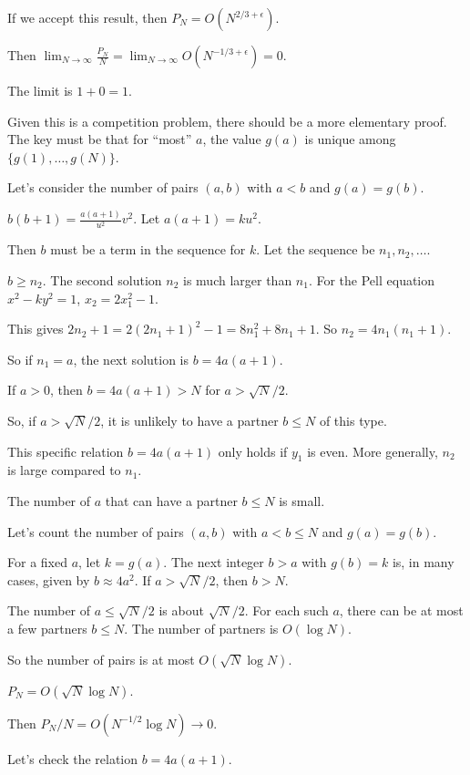 \documentclass[12pt,a4paper]{article}
\theoremstyle{definition}
\begin{document}
    If we accept this result, then $P_N = O(N^{2/3+\epsilon})$.

    Then $\lim_{N\to\infty} \frac{P_N}{N} = \lim_{N\to\infty} O(N^{-1/3+\epsilon}) = 0$.

    The limit is $1+0=1$.

    Given this is a competition problem, there should be a more elementary proof. The key must be that for ``most'' $a$, the value $g(a)$ is unique among $\{g(1), \dots, g(N)\}$.

    Let's consider the number of pairs $(a,b)$ with $a<b$ and $g(a)=g(b)$.

    $b(b+1) = \frac{a(a+1)}{u^2}v^2$. Let $a(a+1)=k u^2$.

    Then $b$ must be a term in the sequence for $k$. Let the sequence be $n_1, n_2, \dots$.

    $b \geq n_2$. The second solution $n_2$ is much larger than $n_1$. For the Pell equation $x^2-ky^2=1$, $x_2 = 2x_1^2-1$.

    This gives $2n_2+1 = 2(2n_1+1)^2-1 = 8n_1^2+8n_1+1$. So $n_2 = 4n_1(n_1+1)$.

    So if $n_1=a$, the next solution is $b=4a(a+1)$.

    If $a>0$, then $b=4a(a+1)>N$ for $a > \sqrt{N}/2$.

    So, if $a > \sqrt{N}/2$, it is unlikely to have a partner $b \leq N$ of this type.

    This specific relation $b=4a(a+1)$ only holds if $y_1$ is even. More generally, $n_2$ is large compared to $n_1$.

    The number of $a$ that can have a partner $b \leq N$ is small.

    Let's count the number of pairs $(a,b)$ with $a<b \leq N$ and $g(a)=g(b)$.

    For a fixed $a$, let $k=g(a)$. The next integer $b>a$ with $g(b)=k$ is, in many cases, given by $b \approx 4a^2$. If $a > \sqrt{N}/2$, then $b>N$.

    The number of $a \leq \sqrt{N}/2$ is about $\sqrt{N}/2$. For each such $a$, there can be at most a few partners $b \leq N$. The number of partners is $O(\log N)$.

    So the number of pairs is at most $O(\sqrt{N}\log N)$.

    $P_N = O(\sqrt{N}\log N)$.

    Then $P_N/N = O(N^{-1/2}\log N) \to 0$.

    Let's check the relation $b=4a(a+1)$.
\end{document}
